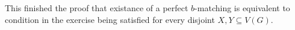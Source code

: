 \begin{exercise}{3}
    This finished the proof that existance of a perfect $b$-matching is
    equivalent to condition in the exercise being satisfied for every disjoint
    $X, Y \subseteq V(G)$.
    


\end{exercise}



